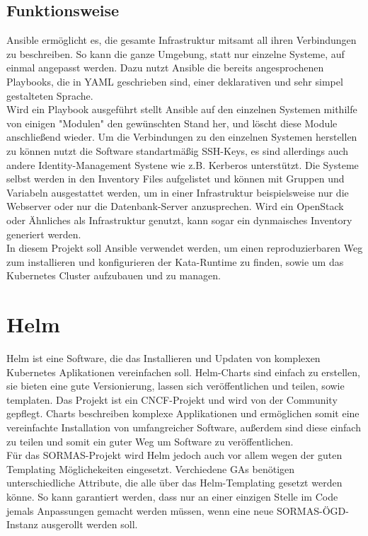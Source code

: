 \subsection{Funktionsweise}
Ansible ermöglicht es, die gesamte Infrastruktur mitsamt all ihren Verbindungen zu beschreiben. 
So kann die ganze Umgebung, statt nur einzelne Systeme, auf einmal angepasst werden.
Dazu nutzt Ansible die bereits angesprochenen Playbooks, die in \ac{YAML} geschrieben sind, einer deklarativen und sehr simpel gestalteten Sprache.
\\
Wird ein Playbook ausgeführt stellt Ansible auf den einzelnen Systemen mithilfe von einigen "Modulen" den gewünschten Stand her, und löscht diese Module anschließend wieder. 
Um die Verbindungen zu den einzelnen Systemen herstellen zu können nutzt die Software standartmäßig \ac{SSH}-Keys, es sind allerdings auch andere Identity-Management Systene wie z.B. Kerberos unterstützt.
Die Systeme selbst werden in den Inventory Files aufgelistet und können mit Gruppen und Variabeln ausgestattet werden, um in einer Infrastruktur beispielsweise nur die Webserver oder nur die Datenbank-Server anzusprechen.
Wird ein OpenStack oder Ähnliches als Infrastruktur genutzt, kann sogar ein dynmaisches Inventory generiert werden.
\cite{how_ansible_works}
\\
In diesem Projekt soll Ansible verwendet werden, um einen reproduzierbaren Weg zum installieren und konfigurieren der Kata-Runtime zu finden, sowie um das Kubernetes Cluster aufzubauen und zu managen. 


\section{Helm}
Helm ist eine Software, die das Installieren und Updaten von komplexen Kubernetes Aplikationen vereinfachen soll.
Helm-Charts sind einfach zu erstellen, sie bieten eine gute Versionierung, lassen sich veröffentlichen und teilen, sowie templaten.
Das Projekt ist ein \ac{CNCF}-Projekt und wird von der Community gepflegt.
Charts beschreiben komplexe Applikationen und ermöglichen somit eine vereinfachte Installation von umfangreicher Software, außerdem sind diese einfach zu teilen und somit ein guter Weg um Software zu veröffentlichen.
\cite{helm}
\\
Für das \ac{SORMAS}-Projekt wird Helm jedoch auch vor allem wegen der guten Templating Möglichekeiten eingesetzt.
Verchiedene \ac{GAs} benötigen unterschiedliche Attribute, die alle über das Helm-Templating gesetzt werden könne.
So kann garantiert werden, dass nur an einer einzigen Stelle im Code jemals Anpassungen gemacht werden müssen, wenn eine neue \ac{SORMAS-ÖGD}-Instanz ausgerollt werden soll.

